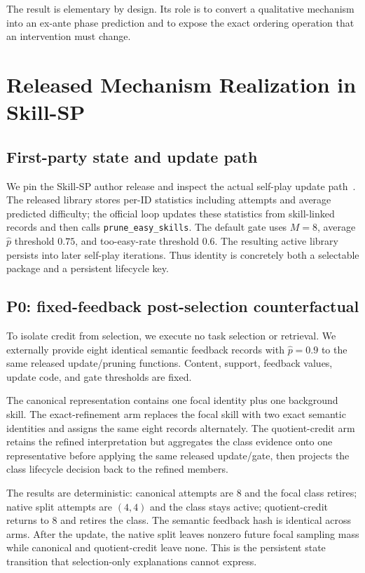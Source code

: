 The result is elementary by design. Its role is to convert a qualitative mechanism into an ex-ante phase prediction and to expose the exact ordering operation that an intervention must change.

\section{Released Mechanism Realization in Skill-SP}

\subsection{First-party state and update path}

We pin the Skill-SP author release and inspect the actual self-play update path~\citep{huang2026skill}. The released library stores per-ID statistics including attempts and average predicted difficulty; the official loop updates these statistics from skill-linked records and then calls \texttt{prune\_easy\_skills}. The default gate uses $M=8$, average $\hat p$ threshold $0.75$, and too-easy-rate threshold $0.6$. The resulting active library persists into later self-play iterations. Thus identity is concretely both a selectable package and a persistent lifecycle key.

\subsection{P0: fixed-feedback post-selection counterfactual}

To isolate credit from selection, we execute no task selection or retrieval. We externally provide eight identical semantic feedback records with $\hat p=0.9$ to the same released update/pruning functions. Content, support, feedback values, update code, and gate thresholds are fixed.

The canonical representation contains one focal identity plus one background skill. The exact-refinement arm replaces the focal skill with two exact semantic identities and assigns the same eight records alternately. The quotient-credit arm retains the refined interpretation but aggregates the class evidence onto one representative before applying the same released update/gate, then projects the class lifecycle decision back to the refined members.

The results are deterministic: canonical attempts are $8$ and the focal class retires; native split attempts are $(4,4)$ and the class stays active; quotient-credit returns to $8$ and retires the class. The semantic feedback hash is identical across arms. After the update, the native split leaves nonzero future focal sampling mass while canonical and quotient-credit leave none. This is the persistent state transition that selection-only explanations cannot express.

